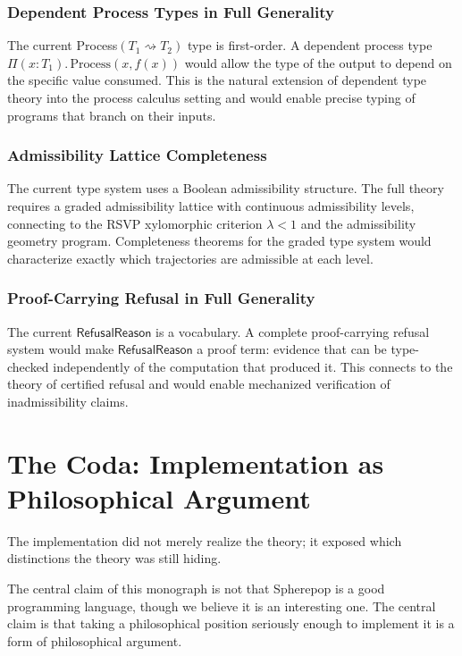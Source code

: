 \documentclass[12pt, a4paper, openany]{book}
\theoremstyle{plain}
\theoremstyle{definition}
\theoremstyle{remark}
\begin{document}
\subsection{Dependent Process Types in Full Generality}

The current Process$(T_1 \rightsquigarrow T_2)$ type is first-order. A dependent
process type $\Pi(x : T_1).\, \mathrm{Process}(x, f(x))$ would allow the type
of the output to depend on the specific value consumed. This is the natural
extension of dependent type theory into the process calculus setting and would
enable precise typing of programs that branch on their inputs.

\subsection{Admissibility Lattice Completeness}

The current type system uses a Boolean admissibility structure. The full theory
requires a graded admissibility lattice with continuous admissibility levels,
connecting to the RSVP xylomorphic criterion $\lambda < 1$ and the admissibility
geometry program. Completeness theorems for the graded type system would
characterize exactly which trajectories are admissible at each level.

\subsection{Proof-Carrying Refusal in Full Generality}

The current $\mathsf{RefusalReason}$ is a vocabulary. A complete proof-carrying
refusal system would make $\mathsf{RefusalReason}$ a proof term: evidence that
can be type-checked independently of the computation that produced it. This
connects to the theory of certified refusal and would enable mechanized
verification of inadmissibility claims.

\chapter{The Coda: Implementation as Philosophical Argument}

The implementation did not merely realize the theory; it exposed which distinctions
the theory was still hiding.

The central claim of this monograph is not that Spherepop is a good programming
language, though we believe it is an interesting one. The central claim is that
taking a philosophical position seriously enough to implement it is a form of
philosophical argument.
\end{document}
